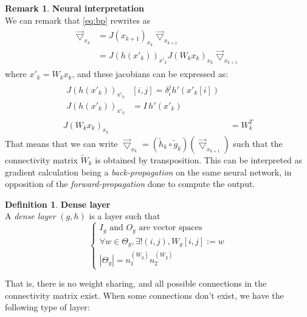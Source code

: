 \documentclass{article}
\theoremstyle{definition}
\newtheorem{definition}{Definition}[section]
\newtheorem{remark}{Remark}
\newcommand{\ovec}{}
\begin{document}
\begin{remark}\textbf{Neural interpretation}\\

We can remark that \eqref{eq:bp} rewrites as
\begin{align}
  \begin{split}
  \vec{\bigtriangledown}_{x_k} & = J(\ovec{x_{k+1}})_{x_k} \vec{\bigtriangledown}_{x_{k+1}} \\ 
                               & = J(h(x'_k))_{x'_k} J(W_k x_k)_{x_k} \vec{\bigtriangledown}_{x_{k+1}}
  \end{split}
\end{align}
where $x'_k = W_k x_k$, and these jacobians can be expressed as:
\begin{align}
  \begin{split}
  J(h(x'_k))_{x'_k} & [i,j] = \delta_i^j h'(x'_k[i])\\
  J(h(x'_k))_{x'_k} & = I \hspace{2pt} h'(x'_k)
  \end{split}\\
  J(W_k x_k)_{x_k} & = W_k^T
\end{align}
That means that we can write $\vec{\bigtriangledown}_{x_k} = (\widetilde{h}_k \circ \widetilde{g}_k)(\vec{\bigtriangledown}_{x_{k+1}})$ such that the connectivity matrix $\widetilde{W}_k$ is obtained by transposition. This can be interpreted as gradient calculation being a \emph{back-propagation} on the same neural network, in opposition of the \emph{forward-propagation} done to compute the output.
\end{remark}

\begin{definition}\textbf{Dense layer}\\
A \textit{dense layer} $(g,h)$ is a layer such that
$$
\left\{
\begin{array}{l}
  I_g \mbox{ and } O_g \mbox{ are vector spaces} \\
  \forall w \in \Theta_g, \exists! (i, j), W_g[i,j] := w \\
  | \Theta_g | = n_1^{(W_g)}n_2^{(W_g)}
\end{array}
\right.
$$
\end{definition}

That is, there is no weight sharing, and all possible connections in the connectivity matrix exist. When some connections don't exist, we have the following type of layer:
\end{document}
